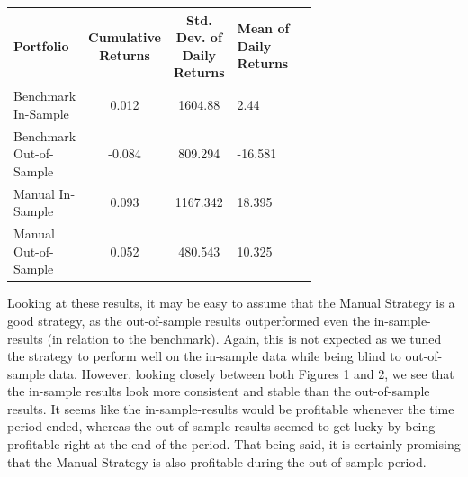 \documentclass[
	letterpaper, %
]{jdf}
\begin{document}
\hfill

\begin{jdftable}
\label{table:Example}
\small %
\begin{tabular}{@{} L{0.15\linewidth} c S L{0.52\linewidth}}
	\textbf{Portfolio} & \textbf{Cumulative Returns} & \textbf{Std. Dev. of Daily Returns} & \textbf{Mean of Daily Returns} \\
	\toprule[0.5pt]
	Benchmark In-Sample & 0.012 & 1604.88 & 2.44\\
	\midrule
	Benchmark Out-of-Sample & -0.084 & 809.294 & -16.581\\
	\midrule
	Manual In-Sample & 0.093 & 1167.342 & 18.395\\
	\midrule
	Manual Out-of-Sample & 0.052 & 480.543 & 10.325\\
\end{tabular}
\end{jdftable}


Looking at these results, it may be easy to assume that the Manual Strategy is a good strategy, as the out-of-sample results outperformed even the in-sample-results (in relation to the benchmark).
Again, this is not expected as we tuned the strategy to perform well on the in-sample data while being blind to out-of-sample data.
However, looking closely between both Figures 1 and 2, we see that the in-sample results look more consistent and stable than the out-of-sample results.
It seems like the in-sample-results would be profitable whenever the time period ended, whereas the out-of-sample results seemed to get lucky by being profitable right at the end of the period.
That being said, it is certainly promising that the Manual Strategy is also profitable during the out-of-sample period.
\end{document}

